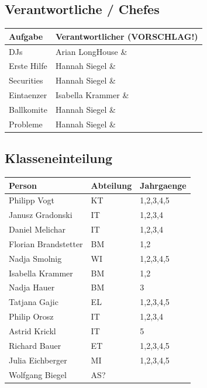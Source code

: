 \documentclass[12pt]{article}
\begin{document}
\subsection{Verantwortliche / Chefes}

\begin{tabular}{ | p{} | p{}  |}
    \hline
\textbf{Aufgabe} & \textbf{Verantwortlicher (VORSCHLAG!)}  \\ 
    \hline 
    \hline
  
DJs  & Arian LongHouse \& \\ \hline
Erste Hilfe & Hannah Siegel \& \\ \hline
Securities  & Hannah Siegel \& \\ \hline
Eintaenzer & Isabella Krammer \& \\ \hline
Ballkomite &  Hannah Siegel \& \\ \hline
Probleme &  Hannah Siegel \& \\ \hline
  \end{tabular}

\subsection{Klasseneinteilung}
  \begin{tabular}{ | p{} | p{} |  p{}  |}
    \hline
\textbf{Person} & \textbf{Abteilung} & \textbf{Jahrgaenge} \\ 
    \hline 
    \hline
 
Philipp Vogt & KT & 1,2,3,4,5 \\ \hline
Janusz Gradonski & IT &  1,2,3,4 \\ \hline
Daniel Melichar & IT & 1,2,3,4 \\ \hline
Florian Brandstetter & BM & 1,2 \\ \hline
Nadja Smolnig & WI & 1,2,3,4,5 \\ \hline
Isabella Krammer & BM & 1,2  \\ \hline
Nadja Hauer & BM & 3  \\ \hline
Tatjana Gajic & EL & 1,2,3,4,5 \\ \hline
Philip Orosz & IT &  1,2,3,4 \\ \hline
Astrid Krickl & IT & 5 \\ \hline
Richard Bauer & ET & 1,2,3,4,5 \\ \hline
Julia Eichberger & MI & 1,2,3,4,5\\ \hline
Wolfgang Biegel  & AS? & \\ \hline
  \end{tabular}
\end{document}
